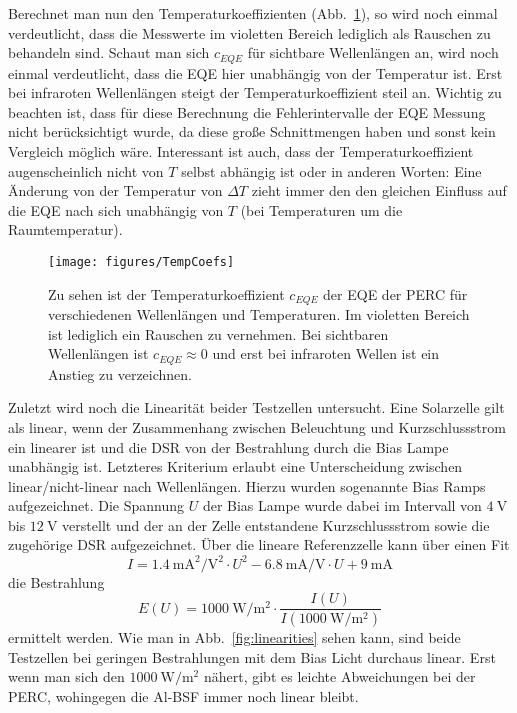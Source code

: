 \documentclass[ngerman, twocolumn]{scrartcl}
\begin{document}
Berechnet man nun den Temperaturkoeffizienten (Abb.~\ref{fig:TempCoefs}), so wird noch einmal verdeutlicht, dass die Messwerte im violetten Bereich lediglich als Rauschen zu behandeln sind. Schaut man sich $c_{EQE}$ für sichtbare Wellenlängen an, wird noch einmal verdeutlicht, dass die EQE hier unabhängig von der Temperatur ist. Erst bei infraroten Wellenlängen steigt der Temperaturkoeffizient steil an. Wichtig zu beachten ist, dass für diese Berechnung die Fehlerintervalle der EQE Messung nicht berücksichtigt wurde, da diese große Schnittmengen haben und sonst kein Vergleich möglich wäre. Interessant ist auch, dass der Temperaturkoeffizient augenscheinlich nicht von $T$ selbst abhängig ist oder in anderen Worten: Eine Änderung von der Temperatur von $\Delta T$ zieht immer den den gleichen Einfluss auf die EQE nach sich unabhängig von $T$ (bei Temperaturen um die Raumtemperatur).

\begin{figure}
\texttt{[image: figures/TempCoefs]}
\caption{Zu sehen ist der Temperaturkoeffizient $c_{EQE}$ der EQE der PERC für verschiedenen Wellenlängen und Temperaturen. Im violetten Bereich ist lediglich ein Rauschen zu vernehmen. Bei sichtbaren Wellenlängen ist $c_{EQE}\approx 0$ und erst bei infraroten Wellen ist ein Anstieg zu verzeichnen.}
\label{fig:TempCoefs}
\end{figure}

Zuletzt wird noch die Linearität beider Testzellen untersucht. Eine Solarzelle gilt als linear, wenn der Zusammenhang zwischen Beleuchtung und Kurzschlussstrom ein linearer ist und die DSR von der Bestrahlung durch die Bias Lampe unabhängig ist. Letzteres Kriterium erlaubt eine Unterscheidung zwischen linear/nicht-linear nach Wellenlängen. Hierzu wurden sogenannte Bias Ramps aufgezeichnet. Die Spannung $U$ der Bias Lampe wurde dabei im Intervall von $\SI{4}{\volt}$ bis $\SI{12}{\volt}$ verstellt und der an der Zelle entstandene Kurzschlussstrom sowie die zugehörige DSR aufgezeichnet. Über die lineare Referenzzelle kann über einen Fit
\begin{equation}
I = \SI{1,4}{\milli\ampere\squared\per\volt\squared}\cdot U^2 - \SI{6,8}{\milli\ampere\per\volt}\cdot U + \SI{9}{\milli\ampere}
\end{equation}
die Bestrahlung
\begin{equation}
E(U) = \SI{1000}{\watt\per\square\meter} \cdot\frac{I(U)}{I(\SI{1000}{\watt\per\square\meter})}
\end{equation}
ermittelt werden. Wie man in Abb.~\ref{fig:linearities} sehen kann, sind beide Testzellen bei geringen Bestrahlungen mit dem Bias Licht durchaus linear. Erst wenn man sich den $\SI{1000}{\watt\per\square\meter}$ nähert, gibt es leichte Abweichungen bei der PERC, wohingegen die Al-BSF immer noch linear bleibt.
\end{document}
